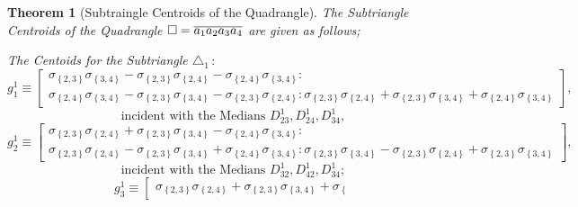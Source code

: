 \documentclass{unswthesis}
\newtheorem{theorem}{Theorem}
\begin{document}
\begin{theorem}[Subtraingle Centroids of the Quadrangle]
The Subtriangle Centroids of the Quadrangle $\square =\overline{%
a_{1}a_{2}a_{3}a_{4}}$ are given as follows;

The Centoids for the Subtriangle $\triangle _{1}\,:$%
\begin{equation*}
g_{1}^{1}\equiv \left[ 
\begin{array}{c}
\sigma _{\left\{ 2,3\right\} }\sigma _{\left\{ 3,4\right\} }-\sigma
_{\left\{ 2,3\right\} }\sigma _{\left\{ 2,4\right\} }-\sigma _{\left\{
2,4\right\} }\sigma _{\left\{ 3,4\right\} }: \\ 
\sigma _{\left\{ 2,4\right\} }\sigma _{\left\{ 3,4\right\} }-\sigma
_{\left\{ 2,3\right\} }\sigma _{\left\{ 3,4\right\} }-\sigma _{\left\{
2,3\right\} }\sigma _{\left\{ 2,4\right\} }:\sigma _{\left\{ 2,3\right\}
}\sigma _{\left\{ 2,4\right\} }+\sigma _{\left\{ 2,3\right\} }\sigma
_{\left\{ 3,4\right\} }+\sigma _{\left\{ 2,4\right\} }\sigma _{\left\{
3,4\right\} }%
\end{array}%
\right] ,
\end{equation*}%
\begin{equation*}
\text{incident with the Medians }D_{23}^{1},D_{24}^{1},D_{34}^{1},
\end{equation*}%
\begin{equation*}
g_{2}^{1}\equiv \left[ 
\begin{array}{c}
\sigma _{\left\{ 2,3\right\} }\sigma _{\left\{ 2,4\right\} }+\sigma
_{\left\{ 2,3\right\} }\sigma _{\left\{ 3,4\right\} }-\sigma _{\left\{
2,4\right\} }\sigma _{\left\{ 3,4\right\} }: \\ 
\sigma _{\left\{ 2,3\right\} }\sigma _{\left\{ 2,4\right\} }-\sigma
_{\left\{ 2,3\right\} }\sigma _{\left\{ 3,4\right\} }+\sigma _{\left\{
2,4\right\} }\sigma _{\left\{ 3,4\right\} }:\sigma _{\left\{ 2,3\right\}
}\sigma _{\left\{ 3,4\right\} }-\sigma _{\left\{ 2,3\right\} }\sigma
_{\left\{ 2,4\right\} }+\sigma _{\left\{ 2,3\right\} }\sigma _{\left\{
3,4\right\} }%
\end{array}%
\right] ,
\end{equation*}%
\begin{equation*}
\text{incident with the Medians }D_{32}^{1},D_{42}^{1},D_{34}^{1};
\end{equation*}%
\begin{equation*}
g_{3}^{1}\equiv \left[ 
\begin{array}{c}
\sigma _{\left\{ 2,3\right\} }\sigma _{\left\{ 2,4\right\} }+\sigma
_{\left\{ 2,3\right\} }\sigma _{\left\{ 3,4\right\} }+\sigma _{\left\{
}
\end{array}
\end{equation*}
\end{theorem}
\end{document}
